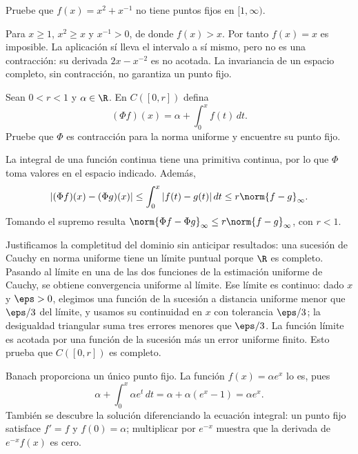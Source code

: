 \begin{ejercicio}\label{ej:lectura-11-3}
Pruebe que $f(x)=x^2+x^{-1}$ no tiene puntos fijos en $[1,\infty)$.
\end{ejercicio}
\begin{solucion}
Para $x\geq1$, $x^2\geq x$ y $x^{-1}>0$, de donde $f(x)>x$. Por tanto $f(x)=x$ es imposible. La aplicación sí lleva el intervalo a sí mismo, pero no es una contracción: su derivada $2x-x^{-2}$ es no acotada. La invariancia de un espacio completo, sin contracción, no garantiza un punto fijo.
\end{solucion}

\begin{ejercicio}\label{ej:lectura-11-4}
Sean $0<r<1$ y $\alpha\in\R$. En $C([0,r])$ defina
\[
 (\Phi f)(x)=\alpha+\int_0^x f(t)\,dt.
\]
Pruebe que $\Phi$ es contracción para la norma uniforme y encuentre su punto fijo.
\end{ejercicio}
\begin{solucion}
La integral de una función continua tiene una primitiva continua, por lo que $\Phi$ toma valores en el espacio indicado. Además,
\[
 |(\Phi f)(x)-(\Phi g)(x)|
 \leq\int_0^x|f(t)-g(t)|\,dt
 \leq r\norm{f-g}_\infty.
\]
Tomando el supremo resulta $\norm{\Phi f-\Phi g}_\infty\leq r\norm{f-g}_\infty$, con $r<1$.

Justificamos la completitud del dominio sin anticipar resultados: una sucesión de Cauchy en norma uniforme tiene un límite puntual porque $\R$ es completo. Pasando al límite en una de las dos funciones de la estimación uniforme de Cauchy, se obtiene convergencia uniforme al límite. Ese límite es continuo: dado $x$ y $\eps>0$, elegimos una función de la sucesión a distancia uniforme menor que $\eps/3$ del límite, y usamos su continuidad en $x$ con tolerancia $\eps/3$; la desigualdad triangular suma tres errores menores que $\eps/3$. La función límite es acotada por una función de la sucesión más un error uniforme finito. Esto prueba que $C([0,r])$ es completo.

Banach proporciona un único punto fijo. La función $f(x)=\alpha e^x$ lo es, pues
\[
 \alpha+\int_0^x\alpha e^t\,dt=\alpha+\alpha(e^x-1)=\alpha e^x.
\]
También se descubre la solución diferenciando la ecuación integral: un punto fijo satisface $f'=f$ y $f(0)=\alpha$; multiplicar por $e^{-x}$ muestra que la derivada de $e^{-x}f(x)$ es cero.
\end{solucion}

